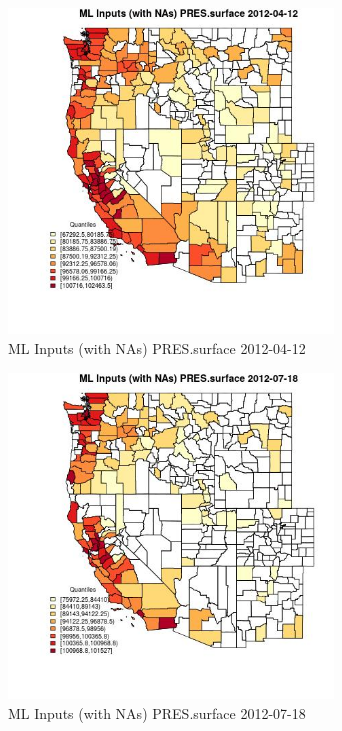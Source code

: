 \clearpage 

\begin{figure} 
\centering  
\includegraphics[width=0.77\textwidth]{Code_Outputs/Report_ML_input_PM25_Step4_part_e_de_duplicated_aves_compiled_2019-05-14wNAs_CountyPRESsurfaceMean2012-04-12_2012-04-12.jpg} 
\caption{\label{fig:Report_ML_input_PM25_Step4_part_e_de_duplicated_aves_compiled_2019-05-14wNAsCountyPRESsurfaceMean2012-04-12_2012-04-12}ML Inputs (with NAs) PRES.surface 2012-04-12} 
\end{figure} 
 

\begin{figure} 
\centering  
\includegraphics[width=0.77\textwidth]{Code_Outputs/Report_ML_input_PM25_Step4_part_e_de_duplicated_aves_compiled_2019-05-14wNAs_CountyPRESsurfaceMean2012-07-18_2012-07-18.jpg} 
\caption{\label{fig:Report_ML_input_PM25_Step4_part_e_de_duplicated_aves_compiled_2019-05-14wNAsCountyPRESsurfaceMean2012-07-18_2012-07-18}ML Inputs (with NAs) PRES.surface 2012-07-18} 
\end{figure} 
 

